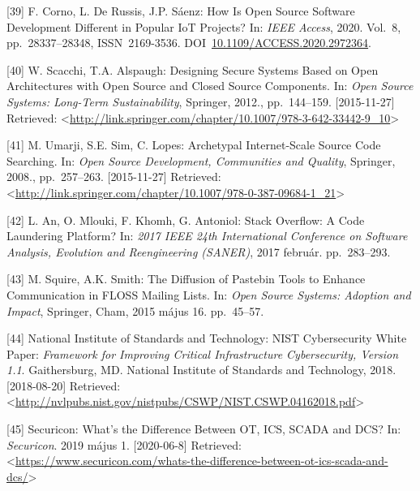\documentclass[12pt,magyar,a4paper,oneside]{scrreprt}
\newenvironment{cslreferences}%
  {}%
  {\par}
\begin{document}
\begin{cslreferences}
\leavevmode\hypertarget{ref-corno_how_2020}{}%
{[}39{]} F. Corno, L. De Russis, J.P. Sáenz: How Is Open Source Software
Development Different in Popular IoT Projects? In: \emph{IEEE Access},
2020. Vol.~8, pp.~28337--28348, ISSN~2169-3536.
DOI~\href{https://doi.org/10.1109/ACCESS.2020.2972364}{10.1109/ACCESS.2020.2972364}.

\leavevmode\hypertarget{ref-scacchi_designing_2012}{}%
{[}40{]} W. Scacchi, T.A. Alspaugh: Designing Secure Systems Based on
Open Architectures with Open Source and Closed Source Components. In:
\emph{Open Source Systems: Long-Term Sustainability}, Springer, 2012.,
pp.~144--159. {[}2015-11-27{]} Retrieved:
\textless{}\url{http://link.springer.com/chapter/10.1007/978-3-642-33442-9_10}\textgreater{}

\leavevmode\hypertarget{ref-umarji_archetypal_2008}{}%
{[}41{]} M. Umarji, S.E. Sim, C. Lopes: Archetypal Internet-Scale Source
Code Searching. In: \emph{Open Source Development, Communities and
Quality}, Springer, 2008., pp.~257--263. {[}2015-11-27{]} Retrieved:
\textless{}\url{http://link.springer.com/chapter/10.1007/978-0-387-09684-1_21}\textgreater{}

\leavevmode\hypertarget{ref-an_stack_2017}{}%
{[}42{]} L. An, O. Mlouki, F. Khomh, G. Antoniol: Stack Overflow: A Code
Laundering Platform? In: \emph{2017 IEEE 24th International Conference
on Software Analysis, Evolution and Reengineering (SANER)}, 2017
február. pp.~283--293.

\leavevmode\hypertarget{ref-squire_diffusion_2015}{}%
{[}43{]} M. Squire, A.K. Smith: The Diffusion of Pastebin Tools to
Enhance Communication in FLOSS Mailing Lists. In: \emph{Open Source
Systems: Adoption and Impact}, Springer, Cham, 2015 május 16.
pp.~45--57.

\leavevmode\hypertarget{ref-national_institute_of_standards_and_technology_framework_2018}{}%
{[}44{]} National Institute of Standards and Technology: NIST
Cybersecurity White Paper: \emph{Framework for Improving Critical
Infrastructure Cybersecurity, Version 1.1}. Gaithersburg, MD. National
Institute of Standards and Technology, 2018. {[}2018-08-20{]} Retrieved:
\textless{}\url{http://nvlpubs.nist.gov/nistpubs/CSWP/NIST.CSWP.04162018.pdf}\textgreater{}

\leavevmode\hypertarget{ref-securicon_whats_2019}{}%
{[}45{]} Securicon: What's the Difference Between OT, ICS, SCADA and
DCS? In: \emph{Securicon}. 2019 május 1. {[}2020-06-8{]} Retrieved:
\textless{}\url{https://www.securicon.com/whats-the-difference-between-ot-ics-scada-and-dcs/}\textgreater{}


\end{cslreferences}
\end{document}
